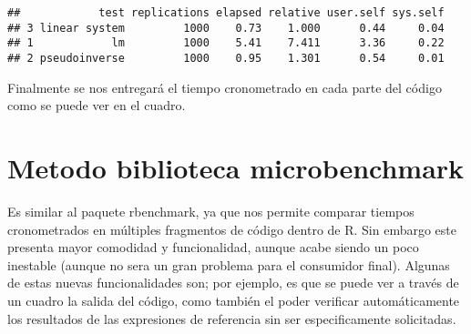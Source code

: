 \documentclass[]{elsarticle} %
\begin{document}
\begin{verbatim}
##            test replications elapsed relative user.self sys.self
## 3 linear system         1000    0.73    1.000      0.44     0.04
## 1            lm         1000    5.41    7.411      3.36     0.22
## 2 pseudoinverse         1000    0.95    1.301      0.54     0.01
\end{verbatim}

Finalmente se nos entregará el tiempo cronometrado en cada parte del
código como se puede ver en el cuadro.

\hypertarget{metodo-biblioteca-microbenchmark}{%
\section{Metodo biblioteca
microbenchmark}\label{metodo-biblioteca-microbenchmark}}

Es similar al paquete rbenchmark, ya que nos permite comparar tiempos
cronometrados en múltiples fragmentos de código dentro de R. Sin embargo
este presenta mayor comodidad y funcionalidad, aunque acabe siendo un
poco inestable (aunque no sera un gran problema para el consumidor
final). Algunas de estas nuevas funcionalidades son; por ejemplo, es que
se puede ver a través de un cuadro la salida del código, como también el
poder verificar automáticamente los resultados de las expresiones de
referencia sin ser especificamente solicitadas.
\end{document}
